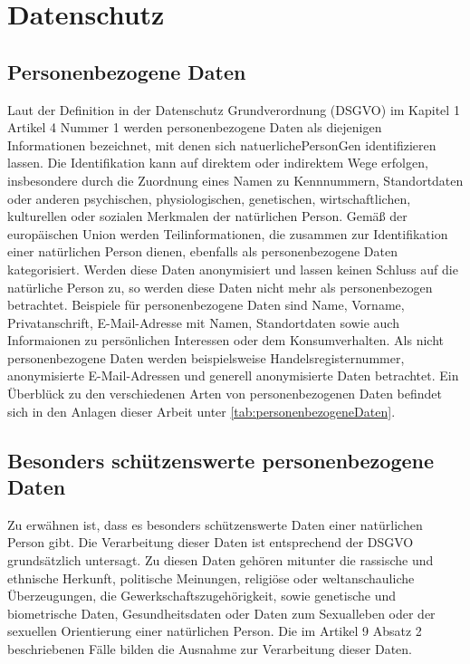 \section{Datenschutz}
\subsection{Personenbezogene Daten}
Laut der Definition in der Datenschutz Grundverordnung (\gls{DSGVO}) im Kapitel 1 Artikel 4 Nummer 1 werden personenbezogene Daten als diejenigen Informationen bezeichnet, mit denen sich \gls{natuerlichePersonG}en identifizieren lassen. Die Identifikation kann auf direktem oder indirektem Wege erfolgen, insbesondere durch die Zuordnung eines Namen zu Kennnummern, Standortdaten oder anderen psychischen, physiologischen, genetischen, wirtschaftlichen, kulturellen oder sozialen Merkmalen der natürlichen Person. \cite{DSGVO_Art4} Gemäß der europäischen Union werden Teilinformationen, die zusammen zur Identifikation einer natürlichen Person dienen, ebenfalls als personenbezogene Daten kategorisiert. Werden diese Daten anonymisiert und lassen keinen Schluss auf die natürliche Person zu, so werden diese Daten nicht mehr als personenbezogen betrachtet. Beispiele für personenbezogene Daten sind Name, Vorname, Privatanschrift, E-Mail-Adresse mit Namen, Standortdaten sowie auch Informaionen zu persönlichen Interessen oder dem Konsumverhalten. Als nicht personenbezogene Daten werden beispielsweise Handelsregisternummer, anonymisierte E-Mail-Adressen und generell anonymisierte Daten betrachtet. \cite{PersBezDaten_2021} Ein Überblück zu den verschiedenen Arten von personenbezogenen Daten befindet sich in den Anlagen dieser Arbeit unter \ref{tab:personenbezogeneDaten}.

\subsection{Besonders schützenswerte personenbezogene Daten} \label{DSGVO_besonders}
Zu erwähnen ist, dass es besonders schützenswerte Daten einer natürlichen Person gibt. Die Verarbeitung dieser Daten ist entsprechend der DSGVO grundsätzlich untersagt. Zu diesen Daten gehören mitunter die rassische und ethnische Herkunft, politische Meinungen, religiöse oder weltanschauliche Überzeugungen, die Gewerkschaftszugehörigkeit, sowie genetische und biometrische Daten, Gesundheitsdaten oder Daten zum Sexualleben oder der sexuellen Orientierung einer natürlichen Person. Die im Artikel 9 Absatz 2 beschriebenen Fälle bilden die Ausnahme zur Verarbeitung dieser Daten. \cite{DSGVO_Art9}